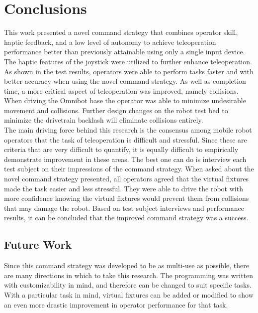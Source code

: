 \documentclass[onecolumn,10pt,final]{asme2ej}
\begin{document}
\section{Conclusions}
\label{sec:con}

This work presented a novel command strategy that combines operator skill, haptic feedback, and a low level of autonomy to achieve teleoperation performance better than previously attainable using only a single input device. The haptic features of the joystick were utilized to further enhance teleoperation. As shown in the test results, operators were able to perform tasks faster and with better accuracy when using the novel command strategy. As well as completion time, a more critical aspect of teleoperation was improved, namely collisions. When driving the Omnibot base the operator was able to minimize undesirable movement and collisions. Further design changes on the robot test bed to minimize the drivetrain backlash will eliminate collisions entirely.\\

The main driving force behind this research is the consensus among mobile robot operators that the task of teleoperation is difficult and stressful. Since these are criteria that are very difficult to quantify, it is equally difficult to empirically demonstrate improvement in these areas. The best one can do is interview each test subject on their impressions of the command strategy. When asked about the novel command strategy presented, all operators agreed that the virtual fixtures made the task easier and less stressful. They were able to drive the robot with more confidence knowing the virtual fixtures would prevent them from collisions that may damage the robot. Based on test subject interviews and performance results, it can be concluded that the improved command strategy was a success.\\

\subsection{Future Work}

Since this command strategy was developed to be as multi-use as possible, there are many directions in which to take this research. The programming was written with customizability in mind, and therefore can be changed to suit specific tasks. With a particular task in mind, virtual fixtures can be added or modified to show an even more drastic improvement in operator performance for that task.\\
\end{document}
